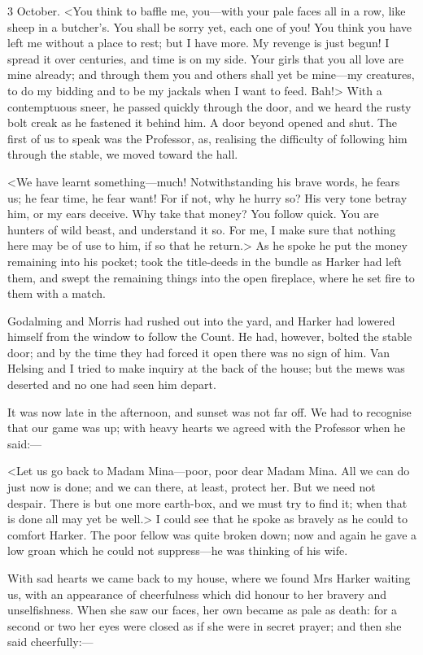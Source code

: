 \begin{diary}{3 October.}
<You think to baffle me, you—with your pale faces all in a row, like sheep in a butcher's. You shall be sorry yet, each one of you! You think you have left me without a place to rest; but I have more. My revenge is just begun! I spread it over centuries, and time is on my side. Your girls that you all love are mine already; and through them you and others shall yet be mine—my creatures, to do my bidding and to be my jackals when I want to feed. Bah!> With a contemptuous sneer, he passed quickly through the door, and we heard the rusty bolt creak as he fastened it behind him. A door beyond opened and shut. The first of us to speak was the Professor, as, realising the difficulty of following him through the stable, we moved toward the hall.

<We have learnt something—much! Notwithstanding his brave words, he fears us; he fear time, he fear want! For if not, why he hurry so? His very tone betray him, or my ears deceive. Why take that money? You follow quick. You are hunters of wild beast, and understand it so. For me, I make sure that nothing here may be of use to him, if so that he return.> As he spoke he put the money remaining into his pocket; took the title-deeds in the bundle as Harker had left them, and swept the remaining things into the open fireplace, where he set fire to them with a match.

Godalming and Morris had rushed out into the yard, and Harker had lowered himself from the window to follow the Count. He had, however, bolted the stable door; and by the time they had forced it open there was no sign of him. Van Helsing and I tried to make inquiry at the back of the house; but the mews was deserted and no one had seen him depart.

It was now late in the afternoon, and sunset was not far off. We had to recognise that our game was up; with heavy hearts we agreed with the Professor when he said:—

<Let us go back to Madam Mina—poor, poor dear Madam Mina. All we can do just now is done; and we can there, at least, protect her. But we need not despair. There is but one more earth-box, and we must try to find it; when that is done all may yet be well.> I could see that he spoke as bravely as he could to comfort Harker. The poor fellow was quite broken down; now and again he gave a low groan which he could not suppress—he was thinking of his wife.

With sad hearts we came back to my house, where we found Mrs Harker waiting us, with an appearance of cheerfulness which did honour to her bravery and unselfishness. When she saw our faces, her own became as pale as death: for a second or two her eyes were closed as if she were in secret prayer; and then she said cheerfully:—


\end{diary}
